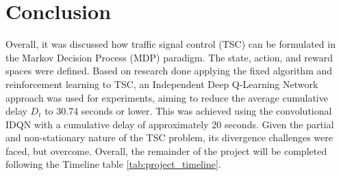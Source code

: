 \documentclass[letterpaper]{article} %
\begin{document}
\section{Conclusion}
Overall, it was discussed how traffic signal control (TSC) can be formulated in the Markov Decision Process (MDP) paradigm. The state, action, and reward spaces were defined.
Based on research done applying the fixed algorithm and reinforcement learning to TSC, an Independent Deep Q-Learning Network approach was used for experiments, aiming to reduce the average cumulative delay \(D_t\) to 30.74 seconds or lower.
This was achieved using the convolutional IDQN with a cumulative delay of approximately 20 seconds.
Given the partial and non-stationary nature of the TSC problem, its divergence challenges were faced, but overcome. Overall, the remainder of the project will be completed following the Timeline table \ref{tab:project_timeline}.




\end{document}
